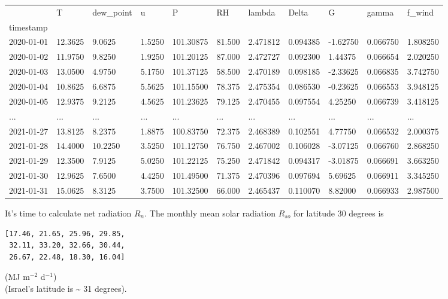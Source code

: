 \documentclass[
  letterpaper,
  DIV=11,
  numbers=noendperiod]{scrreprt}
\begin{document}
\begin{longtable}[]{@{}lllllllllll@{}}
\toprule()
& T & dew\_point & u & P & RH & lambda & Delta & G & gamma & f\_wind \\
timestamp & & & & & & & & & & \\
\midrule()
\endhead
2020-01-01 & 12.3625 & 9.0625 & 1.5250 & 101.30875 & 81.500 & 2.471812 &
0.094385 & -1.62750 & 0.066750 & 1.808250 \\
2020-01-02 & 11.9750 & 9.8250 & 1.9250 & 101.20125 & 87.000 & 2.472727 &
0.092300 & 1.44375 & 0.066654 & 2.020250 \\
2020-01-03 & 13.0500 & 4.9750 & 5.1750 & 101.37125 & 58.500 & 2.470189 &
0.098185 & -2.33625 & 0.066835 & 3.742750 \\
2020-01-04 & 10.8625 & 6.6875 & 5.5625 & 101.15500 & 78.375 & 2.475354 &
0.086530 & -0.23625 & 0.066553 & 3.948125 \\
2020-01-05 & 12.9375 & 9.2125 & 4.5625 & 101.23625 & 79.125 & 2.470455 &
0.097554 & 4.25250 & 0.066739 & 3.418125 \\
... & ... & ... & ... & ... & ... & ... & ... & ... & ... & ... \\
2021-01-27 & 13.8125 & 8.2375 & 1.8875 & 100.83750 & 72.375 & 2.468389 &
0.102551 & 4.77750 & 0.066532 & 2.000375 \\
2021-01-28 & 14.4000 & 10.2250 & 3.5250 & 101.12750 & 76.750 & 2.467002
& 0.106028 & -3.07125 & 0.066760 & 2.868250 \\
2021-01-29 & 12.3500 & 7.9125 & 5.0250 & 101.22125 & 75.250 & 2.471842 &
0.094317 & -3.01875 & 0.066691 & 3.663250 \\
2021-01-30 & 12.9625 & 7.6500 & 4.4250 & 101.49500 & 71.375 & 2.470396 &
0.097694 & 5.69625 & 0.066911 & 3.345250 \\
2021-01-31 & 15.0625 & 8.3125 & 3.7500 & 101.32500 & 66.000 & 2.465437 &
0.110070 & 8.82000 & 0.066933 & 2.987500 \\
\bottomrule()
\end{longtable}

It's time to calculate net radiation \(R_n\). The monthly mean solar
radiation \(R_{so}\) for latitude 30 degrees is

\begin{verbatim}
[17.46, 21.65, 25.96, 29.85,  
 32.11, 33.20, 32.66, 30.44,  
 26.67, 22.48, 18.30, 16.04]
\end{verbatim}

(MJ m\(^{-2}\) d\(^{-1}\))\\
(Israel's latitude is \textasciitilde{} 31 degrees).
\end{document}
